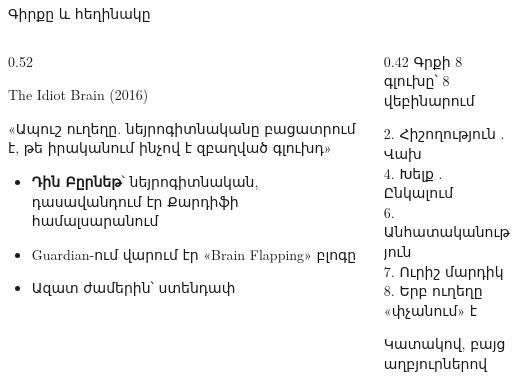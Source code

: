 \begin{frame}{Գիրքը և հեղինակը}
  \begin{columns}[T]
    \begin{column}{0.52\textwidth}
      \begin{card}
        {\blackfont\Large The Idiot Brain} {\small (2016)}\par
        «Ապուշ ուղեղը. նեյրոգիտնականը բացատրում է, թե իրականում ինչով է զբաղված գլուխդ»\par\medskip
        \begin{itemize}
          \item \textbf{Դին Բըրնեթ}՝ նեյրոգիտնական, դասավանդում էր Քարդիֆի համալսարանում
          \item Guardian-ում վարում էր «Brain Flapping» բլոգը
          \item Ազատ ժամերին՝ ստենդափ 
        \end{itemize}
      \end{card}
    \end{column}
    \begin{column}{0.42\textwidth}
      {\blackfont\small Գրքի 8 գլուխը՝ 8 վեբինարում}\par\smallskip
      \par\smallskip
      \par\smallskip
      {\color{plum!55!cream}\small
      2. Հիշողություն . Վախ\\
      4. Խելք . Ընկալում\\
      6. Անհատականություն\\
      7. Ուրիշ մարդիկ\\
      8. Երբ ուղեղը «փչանում» է}\par\smallskip
      \begin{card}[colback=mint!35!cardwhite]
        Կատակով, բայց աղբյուրներով
      \end{card}
    \end{column}
  \end{columns}
\end{frame}

